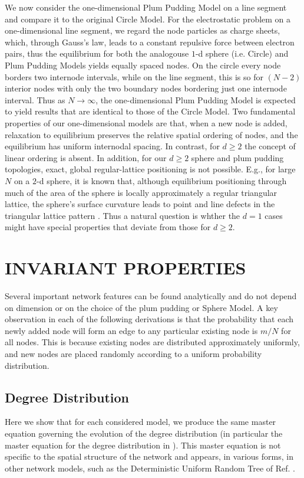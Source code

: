 \documentclass[aps,pre,reprint,superscriptaddress,amsmath,amssymb,nofootinbib]{revtex4-1}
\begin{document}
We now consider the one-dimensional Plum Pudding Model on a line segment and compare it to the original Circle Model.
For the electrostatic problem on a one-dimensional line segment, we regard the node particles as charge sheets, which, through Gauss's law, leads to a constant repulsive force between electron pairs, thus the equilibrium for both the analogouse $1$-d sphere (i.e. Circle) and Plum Pudding Models yields equally spaced nodes. 
On the circle every node borders two internode intervals, while on the line segment, this is so for $(N-2)$ interior nodes with only the two boundary nodes bordering just one internode interval.
Thus as $N \to \infty$, the one-dimensional Plum Pudding Model is expected to yield results that are identical to those of the Circle Model.
Two fundamental properties of our one-dimensional models are that, when a new node is added, relaxation to equilibrium preserves the relative spatial ordering of nodes, and the equilibrium has uniform internodal spacing.
In contrast, for $d \geq 2$ the concept of linear ordering is absent.
In addition, for our $d \geq 2$ sphere and plum pudding topologies, exact, global regular-lattice positioning is not possible.
E.g., for large $N$ on a $2$-d sphere, it is known that, although equilibrium positioning through much of the area of the sphere is locally approximately a regular triangular lattice, the sphere's surface curvature leads to point and line defects in the triangular lattice pattern \cite{nelson}.
Thus a natural question is whther the $d = 1$ cases might have special properties that deviate from those for $d \geq 2$.

\section{INVARIANT PROPERTIES}
Several important network features can be found analytically and do not depend on dimension or on the choice of the plum pudding or Sphere Model.
A key observation in each of the following derivations is that the probability that each newly added node will form an edge to any particular existing node is $m/N$ for all nodes.
This is because existing nodes are distributed approximately uniformly, and new nodes are placed randomly according to a uniform probability distribution.

\subsection{Degree Distribution}
\label{sub:degreedistribution}
Here we show that for each considered model, we produce the same master equation governing the evolution of the degree distribution (in particular the master equation for the degree distribution in \cite{ozik2004}).  
This master equation is not specific to the spatial structure of the network and appears, in various forms, in other network models, such as the Deterministic Uniform Random Tree of Ref. \cite{zhang2008topologies}.
\end{document}
